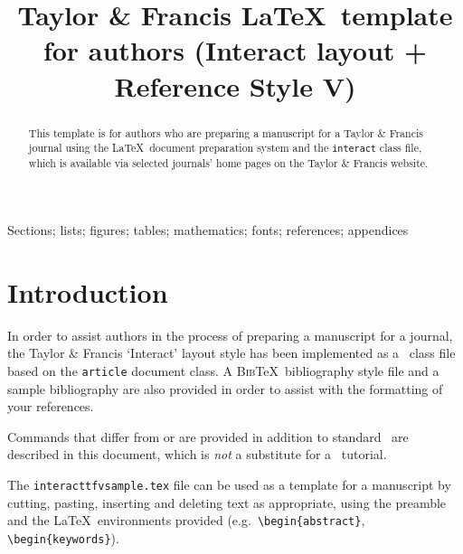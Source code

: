 \documentclass[]{interact}
\theoremstyle{plain}%
\theoremstyle{definition}
\theoremstyle{remark}
\begin{document}

\title{Taylor \& Francis \LaTeX\ template for authors (\textsf{Interact} layout + Reference Style V)}

\author{
}

\maketitle

\begin{abstract}
This template is for authors who are preparing a manuscript for a Taylor \& Francis journal using the \LaTeX\ document preparation system and the \texttt{interact} class file, which is available via selected journals' home pages on the Taylor \& Francis website.
\end{abstract}

\begin{keywords}
Sections; lists; figures; tables; mathematics; fonts; references; appendices
\end{keywords}


\section{Introduction}

In order to assist authors in the process of preparing a manuscript for a journal, the Taylor \& Francis `\textsf{Interact}' layout style has been implemented as a \LaTeXe\ class file based on the \texttt{article} document class. A \textsc{Bib}\TeX\ bibliography style file and a sample bibliography are also provided in order to assist with the formatting of your references.

Commands that differ from or are provided in addition to standard \LaTeXe\ are described in this document, which is \emph{not} a substitute for a \LaTeXe\ tutorial.

The \texttt{interacttfvsample.tex} file can be used as a template for a manuscript by cutting, pasting, inserting and deleting text as appropriate, using the preamble and the \LaTeX\ environments provided (e.g.\ \verb"\begin{abstract}", \verb"\begin{keywords}").
\end{document}
